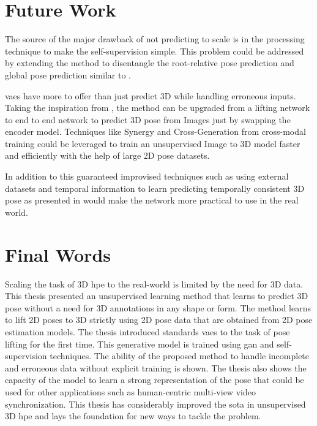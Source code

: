 \section{Future Work}

The source of the major drawback of not predicting to scale is in the processing technique to make the self-supervision simple. This problem could be addressed by extending the method to disentangle the root-relative pose prediction and global pose prediction similar to \cite{CameraDistanceAware}. 

\acp{vae} have more to offer than just predict 3D while handling erroneous inputs. Taking the inspiration from \cite{crossmodal}, the method can be upgraded from a lifting network to end to end network to predict 3D pose from Images just by swapping the encoder model. Techniques like Synergy and Cross-Generation from cross-modal training \cite{MMVAE} could be leveraged to train an unsupervised Image to 3D model faster and efficiently with the help of large 2D pose datasets.

In addition to this guaranteed improvised techniques such as using external datasets and temporal information to learn predicting temporally consistent 3D pose as presented in \cite{amazon1} would make the network more practical to use in the real world.

\section{Final Words}

Scaling the task of 3D \ac{hpe} to the real-world is limited by the need for 3D data. This thesis presented an unsupervised learning method that learns to predict 3D pose without a need for 3D annotations in any shape or form. The method learns to lift 2D poses to 3D strictly using 2D pose data that are obtained from 2D pose estimation models. The thesis introduced standards \acp{vae} to the task of pose lifting for the first time. This generative model is trained using \ac{gan} and self-supervision techniques. The ability of the proposed method to handle incomplete and erroneous data without explicit training is shown. The thesis also shows the capacity of the model to learn a strong representation of the pose that could be used for other applications such as human-centric multi-view video synchronization. This thesis has considerably improved the \ac{sota} in unsupervised 3D \ac{hpe} and lays the foundation for new ways to tackle the problem.




